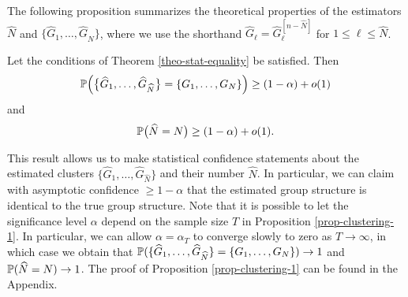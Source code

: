The following proposition summarizes the theoretical properties of the estimators $\widehat{N}$ and $\{ \widehat{G}_1,\ldots,\widehat{G}_{\widehat{N}} \}$, where we use the shorthand $\widehat{G}_\ell = \widehat{G}_\ell^{[n-\widehat{N}]}$ for $1 \le \ell \le \widehat{N}$. 
\begin{prop}\label{prop-clustering-1}
Let the conditions of Theorem \ref{theo-stat-equality} be satisfied. Then 
\[ \mathbb{P} \Big( \big\{ \widehat{G}_1,\ldots,\widehat{G}_{\widehat{N}} \big\} = \{ G_1,\ldots,G_N \} \Big) \ge (1-\alpha) + o(1) \]
and 
\[ \mathbb{P} \big( \widehat{N} = N \big) \ge (1-\alpha) + o(1). \]
\end{prop}
This result allows us to make statistical confidence statements about the estimated clusters $\{ \widehat{G}_1,\ldots,\widehat{G}_{\widehat{N}} \}$ and their number $\widehat{N}$. In particular, we can claim with asymptotic confidence $\ge 1 - \alpha$ that the estimated group structure is identical to the true group structure. Note that it is possible to let the significance level $\alpha$ depend on the sample size $T$ in Proposition \ref{prop-clustering-1}. In particular, we can allow $\alpha = \alpha_T$ to converge slowly to zero as $T \rightarrow \infty$, in which case we obtain that $\mathbb{P} ( \{ \widehat{G}_1,\ldots,\widehat{G}_{\widehat{N}} \} = \{ G_1,\ldots,G_N \} ) \rightarrow 1$ and $\mathbb{P} ( \widehat{N} = N ) \rightarrow 1$. The proof of Proposition \ref{prop-clustering-1} can be found in the Appendix.   


